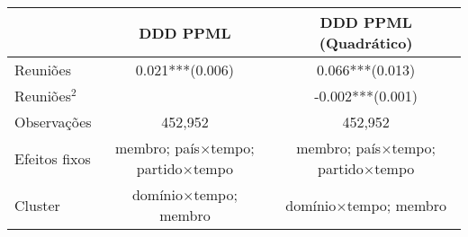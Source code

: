 \begin{tabular}{lcc}
    \toprule
    & DDD PPML & DDD PPML (Quadrático) \\
    \midrule
    Reuniões & 0.021***(0.006) & 0.066***(0.013) \\
    Reuniões$^2$ &  & -0.002***(0.001) \\
    \midrule
    Observações & 452,952 & 452,952 \\
    Efeitos fixos & membro; país$×$tempo; partido$×$tempo & membro; país$×$tempo; partido$×$tempo \\
    Cluster & domínio$×$tempo; membro & domínio$×$tempo; membro \\
    \bottomrule
\end{tabular}
